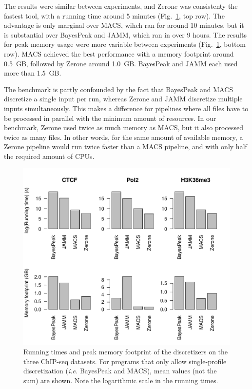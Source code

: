 \documentclass{bioinfo}
\begin{document}
The results were similar between experiments, and Zerone was
consistenty the fastest tool, with a running time around 5 minutes
(Fig.~\ref{fig:perf}, top row). The advantage is only marginal over
MACS, wihch ran for around 10 minutes, but it is substantial over
BayesPeak and JAMM, which ran in over 9 hours. The results for peak
memory usage were more variable between experiments (Fig.~\ref{fig:perf},
bottom row). MACS achieved the best performance with a memory
footprint around 0.5~GB, followed by Zerone around 1.0~GB.
BayesPeak and JAMM each used more than 1.5~GB.

The benchmark is partly confounded by the fact that BayesPeak and MACS
discretize a single input per run, whereas Zerone and JAMM discretize
multiple inputs simultaneously. This makes a difference for pipelines
where all files have to be processed in parallel with the minimum
amount of resources. In our benchmark, Zerone used twice as much memory
as MACS, but it also processed twice as many files. In other words, for
the same amount of available memory, a Zerone pipeline would run twice
faster than a MACS pipeline, and with only half the required amount of
CPUs.


\begin{figure}[!tpb]
\centerline{\includegraphics[scale=0.5]{performance.pdf}}
\caption{Running times and peak memory footprint of the 
discretizers on the three ChIP-seq datasets. For programs that only
allow single-profile discretization (\textit{i.e.} BayesPeak and MACS),
mean values (not the sum) are shown. Note the logarithmic scale in the
running times.
}\label{fig:perf}
\end{figure}
\end{document}
